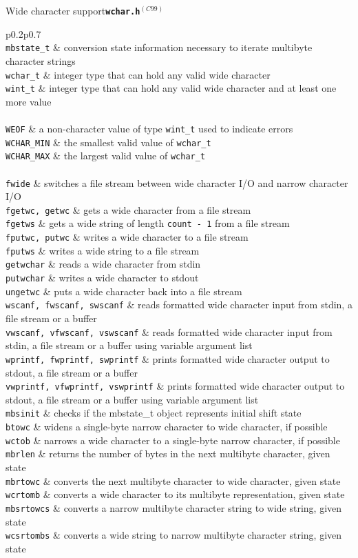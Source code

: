 \documentclass{article}
\newcommand{\newstd}{\ensuremath{^{(C99)}}\xspace}
\newcommand{\librarysection}[5]{{\vspace{2ex}\large #1\quad\textbf{\texttt{#2}}}\par\begin{supertabular}{p{#3\linewidth}p{#4\linewidth}}#5\end{supertabular}}
\newcommand{\funcdescription}[2]{\texttt{#1} & #2 \\}
\newcommand{\smallheader}[1]{\multicolumn{2}{c}{#1} \\}
\begin{document}
\begin{multicols*}{3}
\librarysection{Wide character support}{wchar.h\newstd}{0.2}{0.7}{
\smallheader{\underline{Types}}
\funcdescription{mbstate\_t}{conversion state information necessary to iterate multibyte character strings}
\funcdescription{wchar\_t}{integer type that can hold any valid wide character}
\funcdescription{wint\_t}{integer type that can hold any valid wide character and at least one more value}
\smallheader{\underline{Macros}}
\funcdescription{WEOF}{a non-character value of type \texttt{wint\_t} used to indicate errors}
\funcdescription{WCHAR\_MIN}{the smallest valid value of \texttt{wchar\_t}}
\funcdescription{WCHAR\_MAX}{the largest valid value of \texttt{wchar\_t}}
\smallheader{\underline{Functions}}
\funcdescription{fwide}{switches a file stream between wide character I/O and narrow character I/O}
\funcdescription{fgetwc, getwc}{gets a wide character from a file stream}
\funcdescription{fgetws}{gets a wide string of length \texttt{count - 1} from a file stream}
\funcdescription{fputwc, putwc}{writes a wide character to a file stream}
\funcdescription{fputws}{writes a wide string to a file stream}
\funcdescription{getwchar}{reads a wide character from stdin}
\funcdescription{putwchar}{writes a wide character to stdout}
\funcdescription{ungetwc}{puts a wide character back into a file stream}
\funcdescription{wscanf, fwscanf, swscanf}{reads formatted wide character input from stdin, a file stream or a buffer}
\funcdescription{vwscanf, vfwscanf, vswscanf}{reads formatted wide character input from stdin, a file stream or a buffer using variable argument list}
\funcdescription{wprintf, fwprintf, swprintf}{prints formatted wide character output to stdout, a file stream or a buffer}
\funcdescription{vwprintf, vfwprintf, vswprintf}{prints formatted wide character output to stdout, a file stream or a buffer using variable argument list}
\funcdescription{mbsinit}{checks if the mbstate\_t object represents initial shift state}
\funcdescription{btowc}{widens a single-byte narrow character to wide character, if possible}
\funcdescription{wctob}{narrows a wide character to a single-byte narrow character, if possible}
\funcdescription{mbrlen}{returns the number of bytes in the next multibyte character, given state}
\funcdescription{mbrtowc}{converts the next multibyte character to wide character, given state}
\funcdescription{wcrtomb}{converts a wide character to its multibyte representation, given state}
\funcdescription{mbsrtowcs}{converts a narrow multibyte character string to wide string, given state}
\funcdescription{wcsrtombs}{converts a wide string to narrow multibyte character string, given state}
}
\end{multicols*}
\end{document}
